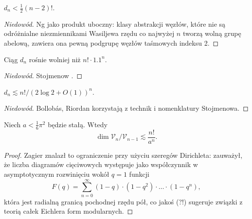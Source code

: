 \begin{proposition}
    $d_n < \frac 12 (n-2)!$.
\end{proposition}

\begin{proof}[Niedowód]
%
    Ng \cite{ng1998} jako produkt uboczny: klasy abstrakcji węzłów, które nie są odróżnialne niezmiennikami Wasiljewa rzędu co najwyżej $n$ tworzą wolną grupę abelową, zawiera ona pewną podgrupę węzłów taśmowych indeksu 2.
\end{proof}

\begin{proposition}
    Ciąg $d_n$ rośnie wolniej niż $n! \cdot 1.1^n$.
\end{proposition}

\begin{proof}[Niedowód]
%
    Stojmenow \cite{stoimenow1998}.
\end{proof}

\begin{proposition}
    $d_n \lesssim n! / (2 \log 2 + O(1))^n$.
\end{proposition}

\begin{proof}[Niedowód]
%
%
    Bollobás, Riordan \cite{bollobas2000} korzystają z technik i nomenklatury Stojmenowa.
\end{proof}

\begin{proposition}
    Niech $a < \frac 1 6 \pi^2$ będzie stałą.
    Wtedy
    \begin{equation}
        \dim \mathcal V_n / \mathcal V_{n-1} \lesssim \frac{n!}{a^n}.
    \end{equation}
\end{proposition}

\begin{proof}
%
%
    Zagier \cite{zagier2001} znalazł to ograniczenie przy użyciu szeregów Dirichleta: zauważył, że liczba diagramów cięciwowych występuje jako współczynnik w asymptotycznym rozwinięciu wokół $q = 1$ funkcji
    \begin{equation}
        F(q) = \sum_{n=0}^\infty (1-q) \cdot (1-q^2) \cdot \ldots \cdot (1-q^n),
    \end{equation}
    która jest radialną granicą pochodnej rzędu pół, co jakoś (?!) sugeruje związki z teorią całek Eichlera form modularnych.
\end{proof}

